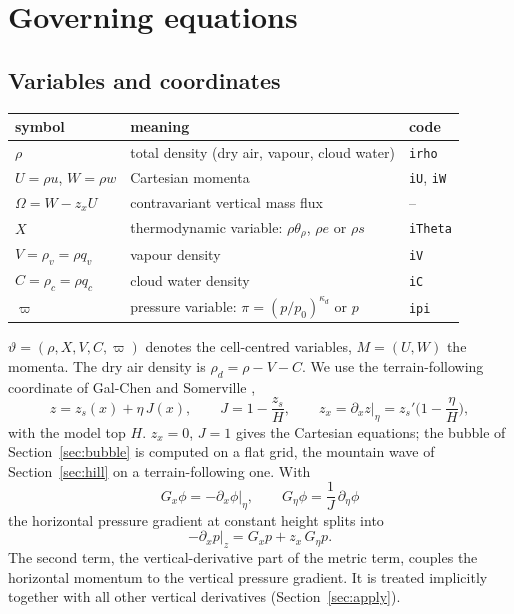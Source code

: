 \documentclass[11pt,a4paper]{article}
\newcommand{\code}[1]{\texttt{\small #1}}
\newcommand{\tv}{\vartheta}   %
\newcommand{\pv}{\varpi}      %
\begin{document}
\section{Governing equations}\label{sec:eq}
\subsection{Variables and coordinates}
\begin{center}\small
\begin{tabular}{lll}\toprule
symbol & meaning & code\\\midrule
$\rho$ & total density (dry air, vapour, cloud water) & \code{irho}\\
$U=\rho u$, $W=\rho w$ & Cartesian momenta & \code{iU}, \code{iW}\\
$\Omega=W-z_xU$ & contravariant vertical mass flux & --\\
$X$ & thermodynamic variable: $\rho\theta_\rho$, $\rho e$ or $\rho s$ & \code{iTheta}\\
$V=\rho_v=\rho q_v$ & vapour density & \code{iV}\\
$C=\rho_c=\rho q_c$ & cloud water density & \code{iC}\\
$\pv$ & pressure variable: $\pi=(p/p_0)^{\kappa_d}$ or $p$ & \code{ipi}\\\bottomrule
\end{tabular}
\end{center}
$\tv=(\rho,X,V,C,\pv)$ denotes the cell-centred variables, $M=(U,W)$ the momenta. The dry air density
is $\rho_d=\rho-V-C$. We use the terrain-following coordinate of Gal-Chen and Somerville
\cite{galchen},
\[
z=z_s(x)+\eta\,J(x),\qquad J=1-\frac{z_s}H,\qquad z_x=\partial_xz\big|_\eta=z_s'\Big(1-\frac\eta H\Big),
\]
with the model top $H$. $z_x=0$, $J=1$ gives the Cartesian equations; the bubble of
Section~\ref{sec:bubble} is computed on a flat grid, the mountain wave of Section~\ref{sec:hill} on a
terrain-following one. With
\[
G_x\phi=-\partial_x\phi\big|_\eta,\qquad G_\eta\phi=\frac1J\,\partial_\eta\phi
\]
the horizontal pressure gradient at constant height splits into
\[
-\partial_xp\big|_z=G_xp+z_x\,G_\eta p .
\]
The second term, the vertical-derivative part of the metric term, couples the horizontal momentum to
the vertical pressure gradient. It is treated implicitly together with all other vertical
derivatives (Section~\ref{sec:apply}).
\end{document}
